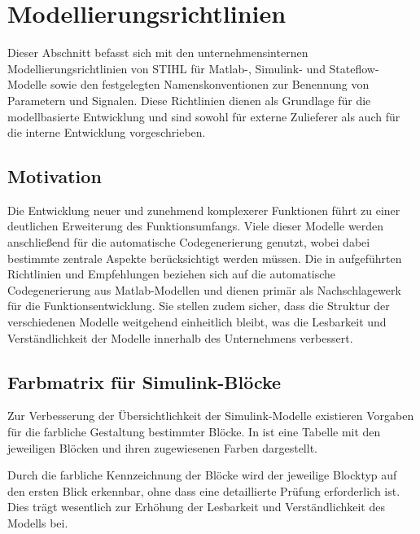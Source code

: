 
\section{Modellierungsrichtlinien}
Dieser Abschnitt befasst sich mit den unternehmensinternen Modellierungsrichtlinien von STIHL für Matlab-, Simulink- und Stateflow-Modelle sowie den festgelegten Namenskonventionen zur Benennung von Parametern und Signalen. Diese Richtlinien dienen als Grundlage für die modellbasierte Entwicklung und sind sowohl für externe Zulieferer als auch für die interne Entwicklung vorgeschrieben.
\subsection{Motivation}
Die Entwicklung neuer und zunehmend komplexerer Funktionen führt zu einer deutlichen Erweiterung des Funktionsumfangs. Viele dieser Modelle werden anschließend für die automatische Codegenerierung genutzt, wobei dabei bestimmte zentrale Aspekte berücksichtigt werden müssen. Die in \cite{ModRichtlinien} aufgeführten Richtlinien und Empfehlungen beziehen sich auf die automatische Codegenerierung aus Matlab-Modellen und dienen primär als Nachschlagewerk für die Funktionsentwicklung. Sie stellen zudem sicher, dass die Struktur der verschiedenen Modelle weitgehend einheitlich bleibt, was die Lesbarkeit und Verständlichkeit der Modelle innerhalb des Unternehmens verbessert.
\subsection{Farbmatrix für Simulink-Blöcke}
Zur Verbesserung der Übersichtlichkeit der Simulink-Modelle existieren Vorgaben für die farbliche Gestaltung bestimmter Blöcke. In  ist eine Tabelle mit den jeweiligen Blöcken und ihren zugewiesenen Farben dargestellt.

Durch die farbliche Kennzeichnung der Blöcke wird der jeweilige Blocktyp auf den ersten Blick erkennbar, ohne dass eine detaillierte Prüfung erforderlich ist. Dies trägt wesentlich zur Erhöhung der Lesbarkeit und Verständlichkeit des Modells bei.
